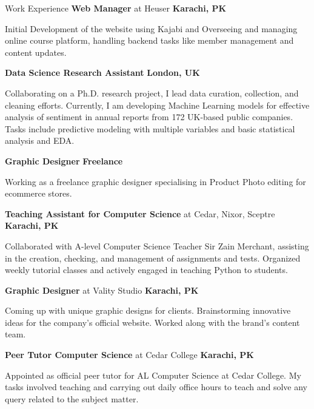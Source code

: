 \begin{rubric}{Work Experience}
%
        \textbf{Web Manager} at Heuser \hfill\textbf{Karachi, PK}
        \par Initial Development of the website using Kajabi and Overseeing and managing online course platform, handling backend tasks like member management and content updates.
        
%
	\textbf{Data Science Research Assistant} \hfill\textbf{London, UK}
        \par Collaborating on a Ph.D. research project, I lead data curation, collection, and cleaning efforts. Currently, I am developing Machine Learning models for effective analysis of sentiment in annual reports from 172 UK-based public companies. Tasks include predictive modeling with multiple variables and basic statistical analysis and EDA.
        
%
        \textbf{Graphic Designer} \hfill\textbf{Freelance}
        \par Working as a freelance graphic designer specialising in Product Photo editing for ecommerce stores. 

%
        \textbf{Teaching Assistant for Computer Science} at Cedar, Nixor, Sceptre \hfill\textbf{Karachi, PK}
        \par Collaborated with A-level Computer Science Teacher Sir Zain Merchant, assisting in the creation, checking, and management of assignments and tests. Organized weekly tutorial classes and actively engaged in teaching Python to students.

%
        \textbf{Graphic Designer} at Vality Studio \hfill\textbf{Karachi, PK}
        \par Coming up with unique graphic designs for clients. Brainstorming innovative ideas for the company's official website. Worked along with the brand's content team.

%
        \textbf{Peer Tutor Computer Science} at Cedar College \hfill\textbf{Karachi, PK}
        \par Appointed as official peer tutor for AL Computer Science at Cedar College. My tasks involved teaching and carrying out daily office hours to teach and solve any query related to the subject matter.
        
        
\end{rubric}